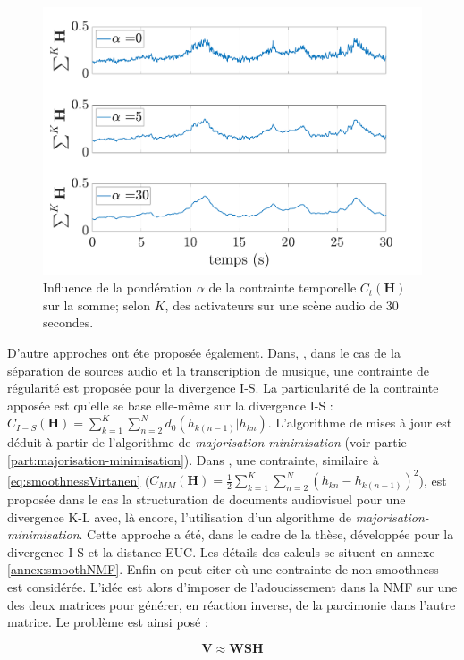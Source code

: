 \begin{figure}[hbtp]
\centering
	\includegraphics[width=0.7\linewidth]{./figures/NMF/smoothness_02.pdf}
\caption{Influence de la pondération $\alpha$ de la contrainte temporelle $C_t(\mathbf{H})$ sur la somme; selon $K$, des activateurs sur une scène audio de 30 secondes.}
\label{fig:smoothnessExample}
\end{figure}

D'autre approches ont éte proposée également. Dans, \cite{fevotte2011majorization}, dans le cas de la séparation de sources audio et la transcription de musique, une contrainte de régularité est proposée pour la divergence I-S. La particularité de la contrainte apposée est qu'elle se base elle-même sur la divergence I-S : $C_{I-S}(\mathbf{H}) = \sum_{k = 1}^{K} \sum_{n = 2}^{N}d_0(h_{k(n-1)} \vert h_{kn})$. L'algorithme de mises à jour est déduit à partir de l'algorithme de \textit{majorisation-minimisation} (voir partie \ref{part:majorisation-minimisation}). Dans \cite{essid2013smooth}, une contrainte, similaire à \ref{eq:smoothnessVirtanen} ($C_{MM}(\mathbf{H}) = \frac{1}{2}\sum_{k = 1}^{K} \sum_{n = 2}^{N}\left(h_{kn}-h_{k(n-1)}\right)^2$), est proposée dans le cas la structuration de documents audiovisuel pour une divergence K-L avec, là encore, l'utilisation d'un algorithme de \textit{majorisation-minimisation}. Cette approche a été, dans le cadre de la thèse, développée pour la divergence I-S et la distance EUC. Les détails des calculs se situent en annexe \ref{annex:smoothNMF}.
Enfin on peut citer \cite{pascual2006nonsmooth} où une contrainte de \og non-smoothness \fg{} est considérée. L'idée est alors d'imposer de l'adoucissement dans la NMF sur une des deux matrices pour générer, en réaction inverse, de la parcimonie dans l'autre matrice. Le problème est ainsi posé : 

\begin{equation}
\mathbf{V} \approx \mathbf{WSH}
\end{equation}

